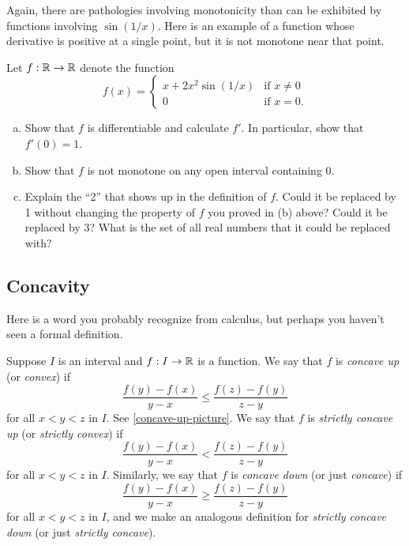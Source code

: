 Again, there are pathologies involving monotonicity than can be exhibited by functions involving $\sin(1/x)$. Here is an example of a function whose derivative is positive at a single point, but it is not monotone near that point. 

\begin{exercise} \label{positive-not-monotone}
	Let $f : \mathbb{R} \to \mathbb{R}$ denote the function
	\[ f(x) = \begin{cases} x + 2x^2 \sin(1/x) & \text{if } x \neq 0 \\ 0 & \text{if } x = 0. \end{cases} \]
	\begin{enumerate}[(a)]
		\item Show that $f$ is differentiable and calculate $f'$. In particular, show that $f'(0) = 1$. 
		\item Show that $f$ is not monotone on any open interval containing 0.  
		\item Explain the ``2'' that shows up in the definition of $f$. Could it be replaced by 1 without changing the property of $f$ you proved in (b) above? Could it be replaced by 3? What is the set of all real numbers that it could be replaced with?
	\end{enumerate}
\end{exercise}

\subsection{Concavity}

Here is a word you probably recognize from calculus, but perhaps you haven't seen a formal definition. 

\begin{definition} \label{concave-up-definition}
	Suppose $I$ is an interval and $f : I \to \mathbb{R}$ is a function. We say that $f$ is \emph{concave up} (or \emph{convex}) if
	\[ \frac{f(y)-f(x)}{y-x} \leq \frac{f(z)-f(y)}{z-y} \]
	for all $x < y < z$ in $I$. 
	See \cref{concave-up-picture}. We say that $f$ is \emph{strictly concave up} (or \emph{strictly convex}) if 
	\[ \frac{f(y)-f(x)}{y-x} < \frac{f(z)-f(y)}{z-y} \]
	for all $x < y < z$ in $I$. 
	Similarly, we say that $f$ is \emph{concave down} (or just \emph{concave}) if
	\[ \frac{f(y)-f(x)}{y-x} \geq \frac{f(z)-f(y)}{z-y} \]
	for all $x < y < z$ in $I$, and we make an analogous definition for \emph{strictly concave down} (or just \emph{strictly concave}). 
\end{definition}

